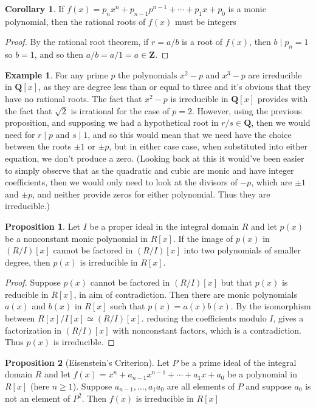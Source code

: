 \documentclass[9pt,reqno]{amsart}
\theoremstyle{definition}
\newtheorem{prop}{Proposition}[section]
\newtheorem{coro}{Corollary}[section]
\newtheorem{ex}{Example}[section]
\newcommand{\zz}{\mathbf Z}
\newcommand{\qq}{\mathbf Q}
\begin{document}
\begin{coro}
If $f(x) = p_nx^n + p_{n-1} p^{n-1} + \cdots + p_1 x+ p_0$ is a monic polynomial, then the rational roots of $f(x)$ must be integers	
\end{coro}
\begin{proof}
	By the rational root theorem, if $r = a/b$ is a root of $f(x)$, then $b \mid p_n =1$ so $b = 1$, and so then $a/b= a/1 = a \in \zz$. 
\end{proof}
\begin{ex}
For any prime $p$ the polynomials $x^2 - p$ and $x^3 - p$ are irreducible in $\qq [x]$, as they are degree less than or equal to three and it's obvious that they have no rational roots. The fact that $x^2 - p$ is irreducible in $\qq[x]$ provides with the fact that $\sqrt{2}$ is irrational for the case of $p=2$. However, using the previous proposition, and supposing we had a hypothetical root in $r/s \in \qq$, then we would need for $r \mid p$ and $s \mid 1$, and so this would mean that we need have the choice between the roots $\pm 1$ or $\pm p$, but in either case case, when substituted into either equation, we don't produce a zero. (Looking back at this it would've been easier to simply observe that as the quadratic and cubic are monic and have integer coefficients, then we would only need to look at the divisors of $-p$, which are $\pm 1$ and $\pm p$, and neither provide zeros for either polynomial. Thus they are irreducible.)
\end{ex}
\begin{prop}
Let $I$ be a proper ideal in the integral domain $R$ and let $p(x)$ be a nonconstant monic polynomial in $R[x]$. If the image of $p(x)$ in $(R/I)[x]$ cannot be factored in $(R/I)[x]$ into two polynomials of smaller degree, then $p(x)$ is irreducible in $R[x]$. 	
\end{prop}
\begin{proof}
	Suppose $p(x)$ cannot be factored in $(R/I)[x]$ but that $p(x)$ is reducible in $R[x]$, in aim of contradiction. Then there are monic polynomials $a(x)$ and $b(x)$ in $R[x]$ such that $p(x) = a(x) b(x)$. By the isomorphism between $R[x]/I[x] \simeq (R/I)[x]$. reducing the coefficients modulo $I$, gives a factorization in $(R/I) [x]$ with nonconstant factors, which is a contradiction. Thus $p(x)$ is irreducible. 
\end{proof}
\begin{prop}[Eisenstein's Criterion] Let $P$ be a prime ideal of the integral domain $R$ and let $f(x) = x^n+ a_{n-1}x^{n-1} + \cdots + a_1 x + a_0$ be a polynomial in $R[x]$ (here $n \geq 1$). Suppose $a_{n-1}, \ldots, a_1 a_0$ are all elements of $P$ and suppose $a_0$ is not an element of $P^2$. Then $f(x)$ is irreducible in $R[x]$
\end{prop}
\end{document}
